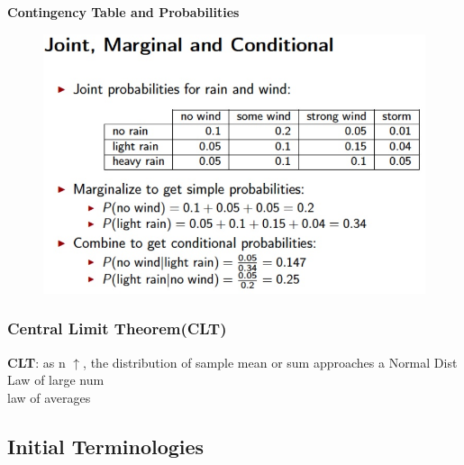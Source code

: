 \documentclass{beamer}
\begin{document}
\begin{frame}\textbf{Contingency Table and Probabilities}
\begin{figure}
\includegraphics[scale=0.5]{JointMarginalConditional} 
\end{figure}
\end{frame}



\begin{frame}\frametitle{Central Limit Theorem(CLT)}
\textbf{CLT}: as n $\uparrow$, the distribution of sample mean or sum approaches a Normal Dist\\
Law of large num \\ law of averages\\
\end{frame}



\subsection{Initial Terminologies}
\end{document}
